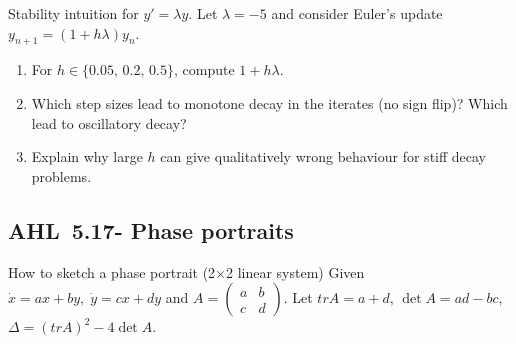 \documentclass[11pt]{article}
\def\textbf#1{#1}%
\def\mathrm#1{#1}%
\newcommand{\tocsubsection}[1]{\subsection{#1}}
\newcounter{question}
\begin{document}
\begin{question}
\textbf{Stability intuition for $y'=\lambda y$.}
Let $\lambda=-5$ and consider Euler’s update $y_{n+1}=(1+h\lambda)y_n$.
\begin{enumerate}
  \item For $h\in\{0.05,\,0.2,\,0.5\}$, compute $1+h\lambda$.
  \item Which step sizes lead to monotone decay in the iterates (no sign flip)? Which lead to oscillatory decay?
  \item Explain why large $h$ can give qualitatively wrong behaviour for stiff decay problems.
\end{enumerate}
\end{question}




\tocsubsection{AHL 5.17- Phase portraits}
\usetikzlibrary{calc}

How to sketch a phase portrait (2×2 linear system)
Given  \(\dot x = ax + by,\;\dot y = cx + dy\) and \(A=\begin{pmatrix}a&b\\c&d\end{pmatrix}\).
Let  \(\mathrm{tr}A=a+d\), \(\det A=ad-bc\), \(\Delta=(\mathrm{tr}A)^2-4\det A\).

\usetikzlibrary{calc}


\newcommand{\MiniAxes}{\draw[ax] (-2,0)--(2,0);\draw[ax] (0,-1.5)--(0,1.5);}
\def\Rbig{1.55} %

\newcommand{\StableNodeTilt}{%
  \def\angA{25}\def\angB{120}
  \MiniAxes
  \draw[ev] (0,0)--(\angA:\Rbig)  (0,0)--(\angA+180:\Rbig);
  \draw[ev] (0,0)--(\angB:\Rbig)  (0,0)--(\angB+180:\Rbig);
  \foreach \r in {1.4,1.15,0.9,0.7,0.5}{
    \draw[traj,->] (\angA:\r)
      .. controls ($ (0,0)!0.45!(\angA:\r) $) and ($ (0,0)!0.38!(\angB:\r) $) .. (0,0);
    \draw[traj,->] (\angB:\r)
      .. controls ($ (0,0)!0.45!(\angB:\r) $) and ($ (0,0)!0.38!(\angA:\r) $) .. (0,0);
  }
}
\end{document}
